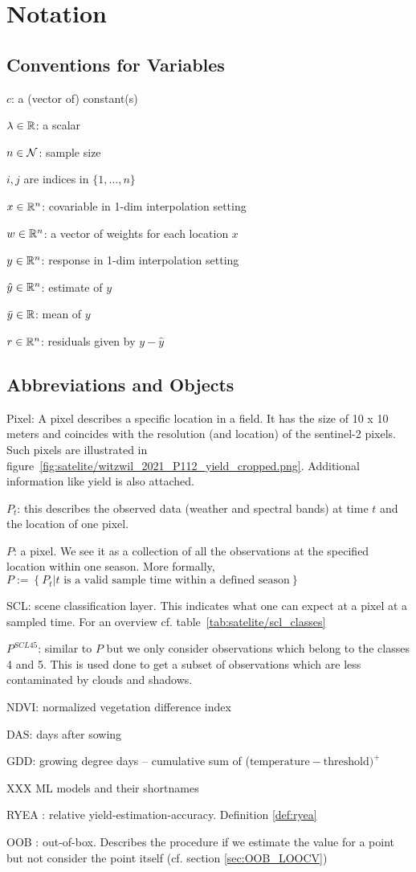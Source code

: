 \chapter*{Notation}
\label{c:Notation}

\section*{Conventions for Variables}
$c$: a (vector of) constant(s)

$\lambda \in \mathbb{R}$: a scalar

$n\in \operatorname{\mathcal{N}}$: sample size

$i,j$ are indices in $\{1,\dots,n\}$

$x\in \mathbb{R}^n$: covariable in 1-dim interpolation setting

$w \in \mathbb{R}^n$: a vector of weights for each location $x$

$y\in \mathbb{R}^n$: response in 1-dim interpolation setting

$\hat y\in \mathbb{R}^n$: estimate of $y$

$\bar y\in \mathbb{R}$: mean of $y$

$r \in \mathbb{R}^n$: residuals given by $y - \hat y$


\section*{Abbreviations and Objects}

Pixel: A pixel describes a specific location in a field. It has the size of 10 x 10 meters and coincides with the resolution (and location) of the sentinel-2 pixels. Such pixels are illustrated in figure~\ref{fig:satelite/witzwil_2021_P112_yield_cropped.png}. Additional information like yield is also attached.

$P_t$: this describes the observed data (weather and spectral bands) at time $t$ and the location of one pixel. 

$P$: a pixel. We see it as a collection of all the observations at the specified location within one season. More formally, $P := \left\{P_t | t\text{ is a valid sample time within a defined season}\right\}$

SCL: scene classification layer. This indicates what one can expect at a pixel at a sampled time. For an overview cf. table~\ref{tab:satelite/scl_classes}

$P^{SCL45}$: similar to $P$ but we only consider observations which belong to the classes 4 and 5. This is used done to get a subset of observations which are less contaminated by clouds and shadows.

NDVI: normalized vegetation difference index

DAS: days after sowing

GDD: growing degree days -- cumulative sum of ($\text{temperature}-\text{threshold})^+$

XXX ML models and their shortnames

RYEA : relative yield-estimation-accuracy. Definition \ref{def:ryea}

OOB : out-of-box. Describes the procedure if we estimate the value for a point but not consider the point itself (cf. section \ref{sec:OOB_LOOCV})
